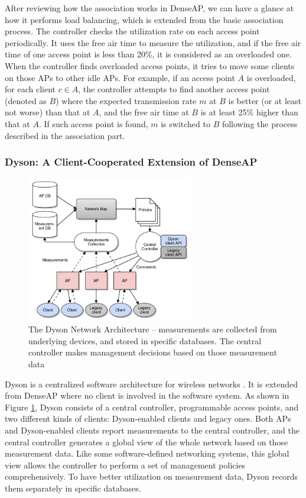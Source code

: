 \documentclass[english]{tktltiki}
\begin{document}
After reviewing how the association works in DenseAP, we can have a glance at how it performs load balancing, which is extended from the basic association process. The controller checks the utilization rate on each access point periodically. It uses the free air time to measure the utilization, and if the free air time of one access point is less than 20\%, it is considered as an overloaded one. When the controller finds overloaded access points, it tries to move some clients on those APs to other idle APs. For example, if an access point $A$ is overloaded, for each client $c \in A$, the controller attempts to find another access point (denoted as $B$) where the expected transmission rate $m$ at $B$ is better (or at least not worse) than that at $A$, and the free air time at $B$ is at least 25\% higher than that at $A$. If such access point is found, $m$ is switched to $B$ following the process described in the association part.


\subsubsection{Dyson: A Client-Cooperated Extension of DenseAP}


\begin{figure}[htbp]
  \centering
  \includegraphics[width=0.65\textwidth]{images/dyson.png}
  \caption{The Dyson Network Architecture -- measurements are collected from underlying devices, and stored in specific databases. The central controller makes management decisions based on those measurement data \cite{mpww10}}
  \label{fig:dyson}
\end{figure}

Dyson is a centralized software architecture for wireless networks \cite{mpww10}. It is extended from DenseAP where no client is involved in the software system. As shown in Figure \ref{fig:dyson}, Dyson consists of a central controller, programmable access points, and two different kinds of clients: Dyson-enabled clients and legacy ones. Both APs and Dyson-enabled clients report measurements to the central controller, and the central controller generates a global view of the whole network based on those measurement data. Like some software-defined networking systems, this global view allows the controller to perform a set of management policies comprehensively. To have better utilization on measurement data, Dyson records them separately in specific databases. 
\end{document}
